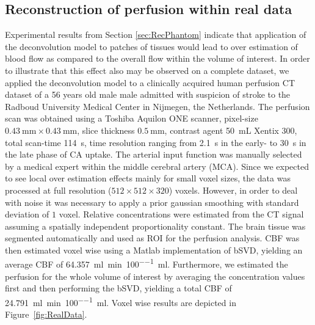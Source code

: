 \documentclass[journal,twocolumn]{IEEEtran}
\newcommand{\siPml}{\milli\litre\per\minute\per100\milli\litre}
\begin{document}
	
	\subsection{Reconstruction of perfusion within real data}\label{sec:RealData}
 	Experimental results from Section \ref{sec:RecPhantom} indicate that application of the deconvolution model to patches of tissues would lead to over estimation of blood flow as compared to the overall flow within the volume of interest.
	In order to illustrate that this effect also may be observed on a complete dataset, we applied the deconvolution model to a clinically acquired human perfusion CT dataset of a 56 years old male male admitted with suspicion of stroke to the Radboud University Medical Center in Nijmegen, the Netherlands.
	The perfusion scan was obtained using a Toshiba Aquilon ONE scanner, pixel-size $\SI{0.43}{\milli\meter}\times\SI{0.43}{\milli\meter}$, slice thickness $\SI{0.5}{\milli\meter}$, contrast agent \SI{50}{\milli\liter} Xentix 300, total scan-time \SI{114}{\second}, time resolution ranging from \SI{2.1}{\second} in the early- to \SI{30}{\second} in the late phase of CA uptake.
	The arterial input function was manually selected by a medical expert within the middle cerebral artery (MCA).
	Since we expected to see local over estimation effects mainly for small voxel sizes, the data was processed at full resolution ($512\times512\times320$) voxels. 
	However, in order to deal with noise it was necessary to apply a prior gaussian smoothing with standard deviation of $1$ voxel.	
	Relative concentrations were estimated from the CT signal assuming a spatially independent proportionality constant. The brain tissue was segmented automatically and used as ROI for the perfusion analysis.
	CBF was then estimated voxel wise using a Matlab implementation of bSVD, yielding an average CBF of \SI{64.357}{\siPml}.
	Furthermore, we estimated the perfusion for the whole volume of interest by averaging the concentration values first and then performing the bSVD, yielding a total CBF of \SI{24.791}{\siPml}.
	Voxel wise results are depicted in Figure~\ref{fig:RealData}.
	
\end{document}
